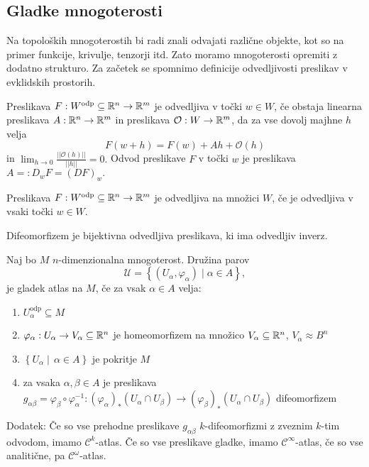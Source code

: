 \subsection{Gladke mnogoterosti}%

Na topoloških mnogoterostih bi radi znali odvajati različne objekte,
kot so na primer funkcije, krivulje, tenzorji itd. Zato moramo
mnogoterosti opremiti z dodatno strukturo. Za začetek se spomnimo
definicije odvedljivosti preslikav v evklidskih prostorih.

\begin{definicija}
Preslikava $F: W^{\text{odp}} \subseteq
\mathbb{R} ^n \to \mathbb{R} ^m$ je odvedljiva v točki $w \in W$, če
obstaja linearna preslikava $A : \mathbb{R} ^n \to \mathbb{R} ^m$ in
preslikava $\mathcal{O}: W \to \mathbb{R} ^m$, da za vse dovolj majhne $h$ velja \begin{equation*} F\left( w + h \right) = F\left( w \right) + Ah
+ \mathcal{O}\left( h \right)\end{equation*} in $\lim_{h \to 0}
\frac{\lvert\lvert \mathcal{O}\left( h \right) \rvert\rvert
}{\lvert\lvert h \rvert\rvert } = 0.$ Odvod preslikave $F$ v točki $w$
je preslikava $A =: D_wF = \left( DF \right)_w.$
\end{definicija}


\begin{definicija}
\label{def_odvedljivost}
Preslikava $F: W^{\text{odp}} \subseteq  \mathbb{R} ^n \to \mathbb{R} ^m$ je odvedljiva
na množici $W$, če je odvedljiva v vsaki točki $w \in
W$.
\end{definicija}

\begin{definicija} \label{def_difeomorfizem} Difeomorfizem je
bijektivna odvedljiva preslikava, ki ima odvedljiv inverz. 
\end{definicija}

\begin{definicija}
\label{def_atlas}
Naj bo $M$ $n$-dimenzionalna mnogoterost. Družina parov $$\mathcal{U} = \left\{ \left( U_\alpha, \varphi_\alpha\right)
\mid \alpha \in  A \right\},$$ je gladek atlas na $M$, če za vsak $\alpha \in A$ velja:
\begin{enumerate}
 \item $U_\alpha^{\text{odp}} \subseteq M$
 \item $\varphi_\alpha: U_\alpha \to V_\alpha \subseteq \mathbb{R} ^n$
je homeomorfizem na množico $V_\alpha \subseteq \mathbb{R} ^n$, $V_\alpha \approx B^{n}$
 \item $\left\{ U_\alpha \middle|\, \alpha\in  A \right\}$ je
pokritje $M$ \item za vsaka $\alpha, \beta \in A$ je
preslikava $g_{\alpha \beta}  = \varphi_\beta \circ
\varphi_\alpha^{-1}: (\varphi_\alpha)_{*}(U_\alpha \cap
U_\beta) \to(\varphi_\beta)_{*}(U_\alpha \cap  U_\beta)$
difeomorfizem 
\end{enumerate}
Dodatek: Če so vse prehodne
preslikave $g_{\alpha \beta}$  $k$-difeomorfizmi z zveznim $k$-tim
odvodom, imamo $\mathcal{C}^{k}$-atlas. Če so vse preslikave gladke,
imamo $\mathcal{C}^{\infty}$-atlas, če so vse analitične, pa
$\mathcal{C}^{\omega}$-atlas.     
\end{definicija}

